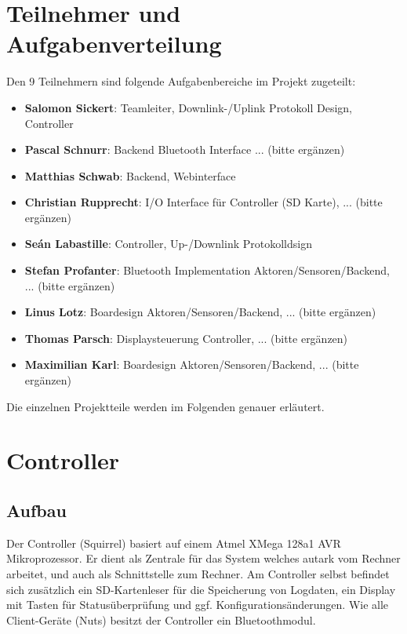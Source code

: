 \documentclass[12pt,a4paper]{article}
\begin{document}
\section{Teilnehmer und Aufgabenverteilung}

Den 9 Teilnehmern sind folgende Aufgabenbereiche im Projekt zugeteilt:\\

\begin{itemize}
	\item {\bf Salomon Sickert}: Teamleiter, Downlink-/Uplink Protokoll Design, Controller
	\item {\bf Pascal Schnurr}: Backend Bluetooth Interface ... (bitte ergänzen)
	\item {\bf Matthias Schwab}: Backend, Webinterface
	\item {\bf Christian Rupprecht}: I/O Interface für Controller (SD Karte), ... (bitte ergänzen)
	\item {\bf Seán Labastille}: Controller, Up-/Downlink Protokolldsign
	\item {\bf Stefan Profanter}: Bluetooth Implementation Aktoren/Sensoren/Backend, ... (bitte ergänzen)
	\item {\bf Linus Lotz}: Boardesign Aktoren/Sensoren/Backend, ... (bitte ergänzen)
	\item {\bf Thomas Parsch}: Displaysteuerung Controller, ... (bitte ergänzen)
	\item {\bf Maximilian Karl}: Boardesign Aktoren/Sensoren/Backend, ... (bitte ergänzen)
\end{itemize}

Die einzelnen Projektteile werden im Folgenden genauer erläutert.

\section{Controller}

\subsection{Aufbau}

Der Controller (Squirrel) basiert auf einem Atmel XMega 128a1 AVR Mikroprozessor.
Er dient als Zentrale für das System welches autark vom Rechner arbeitet, und auch als Schnittstelle zum Rechner.
Am Controller selbst befindet sich zusätzlich ein SD-Kartenleser für die Speicherung von Logdaten, ein Display mit Tasten für Statusüberprüfung und ggf. Konfigurationsänderungen.
Wie alle Client-Geräte (Nuts) besitzt der Controller ein Bluetoothmodul.\\
\end{document}
